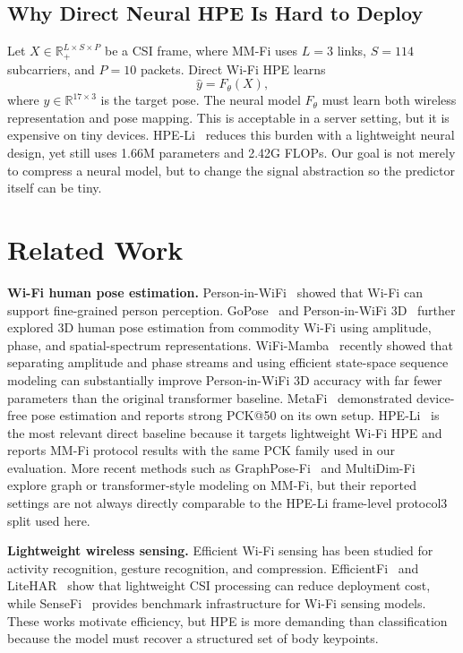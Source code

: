 \documentclass[10pt,conference]{IEEEtran}
\begin{document}
\subsection{Why Direct Neural HPE Is Hard to Deploy}

Let $X\in\mathbb{R}_{+}^{L\times S\times P}$ be a CSI frame, where MM-Fi uses $L=3$ links, $S=114$ subcarriers, and $P=10$ packets. Direct Wi-Fi HPE learns
\begin{equation}
\hat{y}=F_\theta(X),
\end{equation}
where $y\in\mathbb{R}^{17\times3}$ is the target pose. The neural model $F_\theta$ must learn both wireless representation and pose mapping. This is acceptable in a server setting, but it is expensive on tiny devices. HPE-Li~\cite{hpeli2024} reduces this burden with a lightweight neural design, yet still uses 1.66M parameters and 2.42G FLOPs. Our goal is not merely to compress a neural model, but to change the signal abstraction so the predictor itself can be tiny.

\section{Related Work}

\textbf{Wi-Fi human pose estimation.}
Person-in-WiFi~\cite{personwifi2019} showed that Wi-Fi can support fine-grained person perception. GoPose~\cite{gopose2021} and Person-in-WiFi 3D~\cite{personwifi3d2024} further explored 3D human pose estimation from commodity Wi-Fi using amplitude, phase, and spatial-spectrum representations. WiFi-Mamba~\cite{wifimamba2026} recently showed that separating amplitude and phase streams and using efficient state-space sequence modeling can substantially improve Person-in-WiFi 3D accuracy with far fewer parameters than the original transformer baseline. MetaFi~\cite{metafi2022} demonstrated device-free pose estimation and reports strong PCK@50 on its own setup. HPE-Li~\cite{hpeli2024} is the most relevant direct baseline because it targets lightweight Wi-Fi HPE and reports MM-Fi protocol results with the same PCK family used in our evaluation. More recent methods such as GraphPose-Fi~\cite{graphposefi2026} and MultiDim-Fi~\cite{multidimfi2025} explore graph or transformer-style modeling on MM-Fi, but their reported settings are not always directly comparable to the HPE-Li frame-level protocol3 split used here.

\textbf{Lightweight wireless sensing.}
Efficient Wi-Fi sensing has been studied for activity recognition, gesture recognition, and compression. EfficientFi~\cite{efficientfi2023} and LiteHAR~\cite{litehar2022} show that lightweight CSI processing can reduce deployment cost, while SenseFi~\cite{sensefi2023} provides benchmark infrastructure for Wi-Fi sensing models. These works motivate efficiency, but HPE is more demanding than classification because the model must recover a structured set of body keypoints.
\end{document}
